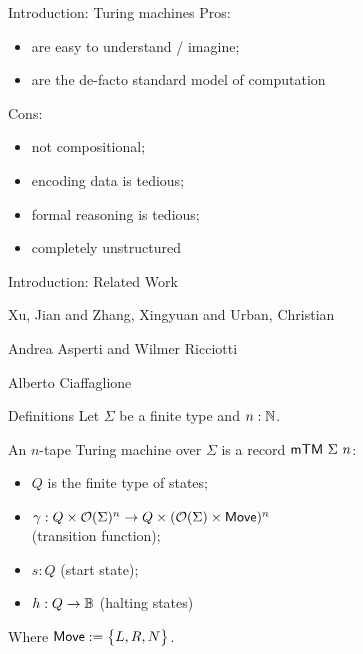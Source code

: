 \begin{frame}{Introduction: Turing machines}
  Pros:
  \begin{itemize}
    \item are easy to understand / imagine;
    \item are the de-facto standard model of computation
  \end{itemize}
  \pause%
  Cons:
  \begin{itemize}
    \item not compositional;
    \item encoding data is tedious;
    \item formal reasoning is tedious;
    \item completely unstructured
  \end{itemize}
\end{frame}

\begin{frame}{Introduction: Related Work}
  \footnotesize
  \begin{thebibliography}{10}
    \beamertemplatearticlebibitems%
    \bibitem{}
    Xu, Jian and Zhang, Xingyuan and Urban, Christian

    \bibitem{}
    Andrea Asperti and Wilmer Ricciotti

    \bibitem{}
    Alberto Ciaffaglione
  \end{thebibliography}
\end{frame}


\begin{frame}{Definitions}
  Let $\Sigma$ be a finite type and $n:\mathbb{N}$.
  \begin{definition}
    An $n$-tape Turing machine over $\Sigma$ is a record $\textsf{mTM}~\Sigma~n$:
    \begin{itemize}
      \item $Q$ is the finite type of states;
      \item $\gamma : Q \times \mathcal{O}(\Sigma)^n \rightarrow Q \times (\mathcal{O}(\Sigma) \times \textsf{Move})^n$
        \\ (transition function);
      \item $s:Q$ (start state);
      \item $h : Q \rightarrow \mathbb{B}$ (halting states)
    \end{itemize}
    Where $\textsf{Move} := \bigl\{ L, R, N \bigr \}$.
  \end{definition}
\end{frame}

